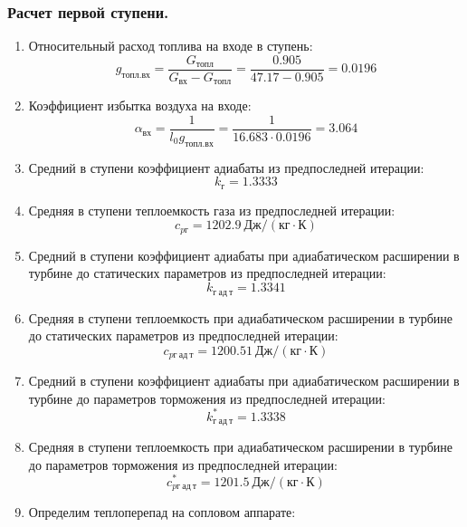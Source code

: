 \documentclass[a4paper,12pt]{article}
\begin{document}
    \subsubsection{Расчет первой ступени.}
%    
    \begin{enumerate}

        \item Относительный расход топлива на входе в ступень:
        \[
            g_{топл.вх} = \frac{ G_{топл} }{ G_{вх} - G_{топл} } =
                \frac{ 0.905 }{ 47.17 - 0.905 } =
            0.0196
        \]

        \item Коэффициент избытка воздуха на входе:
        \[
            \alpha_{вх} = \frac{ 1 }{ l_0 g_{топл.вх} } =
                \frac{ 1 }{ 16.683 \cdot 0.0196 } =
            3.064
        \]

        \item Средний в ступени коэффициент адиабаты из предпоследней итерации:
        \[
            k_г = 1.3333
        \]

        \item Средняя в ступени теплоемкость газа из предпоследней итерации:
        \[
            c_{pг} = 1202.9 \ Дж/(кг \cdot К)
        \]

        \item Средний в ступени коэффициент адиабаты при адиабатическом расширении в турбине до статических параметров из предпоследней итерации:
        \[
            k_{г\ ад\ т} = 1.3341
        \]

        \item Средняя в ступени теплоемкость при адиабатическом расширении в турбине до статических параметров из предпоследней итерации:
        \[
            c_{pг\ ад\ т} = 1200.51 \ Дж/(кг \cdot К)
        \]

        \item Средний в ступени коэффициент адиабаты при адиабатическом расширении в турбине до параметров торможения из предпоследней итерации:
        \[
            k_{г\ ад\ т}^* = 1.3338
        \]

        \item Средняя в ступени теплоемкость при адиабатическом расширении в турбине до параметров торможения из предпоследней итерации:
        \[
            c_{pг\ ад\ т}^* = 1201.5 \ Дж/(кг \cdot К)
        \]

        
        

        

        \item Определим теплоперепад на сопловом аппарате:


\end{enumerate}
\end{document}
